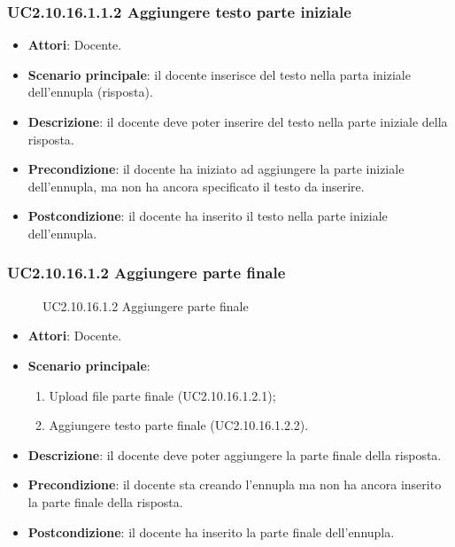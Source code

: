 \subsubsection{UC2.10.16.1.1.2 Aggiungere testo parte iniziale}
\begin{itemize}
\item \textbf{Attori}: Docente.
\item \textbf{Scenario principale}: il docente inserisce del testo nella parta iniziale dell'ennupla (risposta).
\item \textbf{Descrizione}: il docente deve poter inserire del testo nella parte iniziale della risposta.
\item \textbf{Precondizione}: il docente ha iniziato ad aggiungere la parte iniziale dell'ennupla, ma non ha ancora specificato il testo da inserire.
\item \textbf{Postcondizione}: il docente ha inserito il testo nella parte iniziale dell'ennupla.
\end{itemize}
\subsubsection{UC2.10.16.1.2 Aggiungere parte finale}
\begin{figure}[H]
\centering
\noindent{}
\caption{UC2.10.16.1.2 Aggiungere parte finale}
\end{figure}
\begin{itemize}
\item \textbf{Attori}: Docente.
\item \textbf{Scenario principale}:
\begin{enumerate}
\item Upload file parte finale (UC2.10.16.1.2.1);
\item Aggiungere testo parte finale (UC2.10.16.1.2.2).
\end{enumerate}
\item \textbf{Descrizione}: il docente deve poter aggiungere la parte finale della risposta.
\item \textbf{Precondizione}: il docente sta creando l'ennupla ma non ha ancora inserito la parte finale della risposta.
\item \textbf{Postcondizione}: il docente ha inserito la parte finale dell'ennupla.
\end{itemize}
